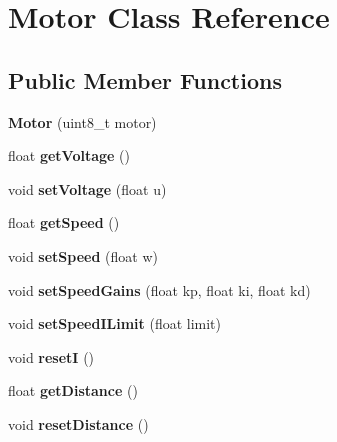 \hypertarget{class_motor}{}\section{Motor Class Reference}
\label{class_motor}
\subsection*{Public Member Functions}
\begin{DoxyCompactItemize}
\item 
\mbox{\label{class_motor_a3fabb1dcecaf752268752a0f43fa2fb8}} 
{\bfseries Motor} (uint8\+\_\+t motor)
\item 
\mbox{\label{class_motor_a76235bce62e0d77e5346e6e8f7c0cbc5}} 
float {\bfseries get\+Voltage} ()
\item 
\mbox{\label{class_motor_ab4a93f9845eff9d8a480015a623efd79}} 
void {\bfseries set\+Voltage} (float u)
\item 
\mbox{\label{class_motor_a16fd26b8314eb4d70fa1910deb482797}} 
float {\bfseries get\+Speed} ()
\item 
\mbox{\label{class_motor_a64385407ec4934a908c0257f82b7bea4}} 
void {\bfseries set\+Speed} (float w)
\item 
\mbox{\label{class_motor_aa74f0ff28a8a9feb8c4c4611cfd401d8}} 
void {\bfseries set\+Speed\+Gains} (float kp, float ki, float kd)
\item 
\mbox{\label{class_motor_aa1713e2fbb9e21731f37214992837463}} 
void {\bfseries set\+Speed\+I\+Limit} (float limit)
\item 
\mbox{\label{class_motor_ab92163695a7882cdd720117ff68ba6fc}} 
void {\bfseries resetI} ()
\item 
\mbox{\label{class_motor_ac53b32c1f6f7585e0ab7ea871af374a5}} 
float {\bfseries get\+Distance} ()
\item 
\mbox{\label{class_motor_afff566edc713a0369ca52724168b7a48}} 
void {\bfseries reset\+Distance} ()

\end{DoxyCompactItemize}
